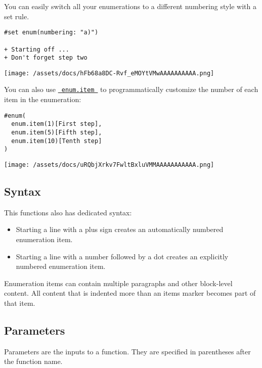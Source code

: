 You can easily switch all your enumerations to a different numbering
style with a set rule.

\begin{verbatim}
#set enum(numbering: "a)")

+ Starting off ...
+ Don't forget step two
\end{verbatim}

\texttt{[image: /assets/docs/hFb68a8DC-Rvf\_eMOYtVMwAAAAAAAAAA.png]}

You can also use
\href{/docs/reference/model/enum/\#definitions-item}{\texttt{\ enum.item\ }}
to programmatically customize the number of each item in the
enumeration:

\begin{verbatim}
#enum(
  enum.item(1)[First step],
  enum.item(5)[Fifth step],
  enum.item(10)[Tenth step]
)
\end{verbatim}

\texttt{[image: /assets/docs/uRQbjXrkv7FwltBxluVMMAAAAAAAAAAA.png]}

\subsection{Syntax}\label{syntax}

This functions also has dedicated syntax:

\begin{itemize}
\tightlist
\item
  Starting a line with a plus sign creates an automatically numbered
  enumeration item.
\item
  Starting a line with a number followed by a dot creates an explicitly
  numbered enumeration item.
\end{itemize}

Enumeration items can contain multiple paragraphs and other block-level
content. All content that is indented more than an
item\textquotesingle s marker becomes part of that item.

\subsection{\texorpdfstring{{ Parameters
}}{ Parameters }}\label{parameters}

\label{parameters-tooltip}
Parameters are the inputs to a function. They are specified in
parentheses after the function name.

